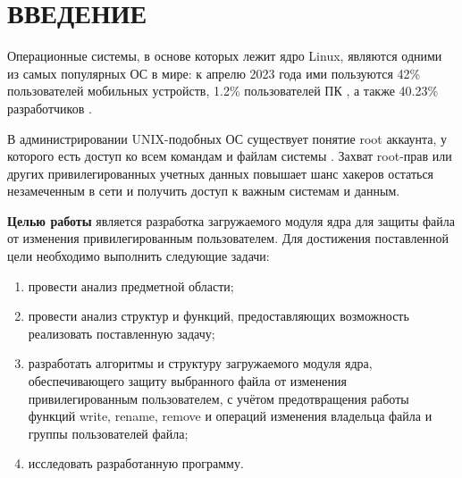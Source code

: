 \section*{\large ВВЕДЕНИЕ}

Операционные системы, в основе которых лежит ядро Linux, являются одними из самых популярных ОС в мире: к апрелю 2023 года ими пользуются 42\% пользователей мобильных устройств, 1.2\% пользователей ПК \cite{linux-statistics-2023}, а также 40.23\% разработчиков \cite{linux-dev-stats-stackoverflow}. 

В администрировании UNIX-подобных ОС существует понятие root аккаунта, у которого есть доступ ко всем командам и файлам системы \cite{root-definition}.
Захват root-прав или других привилегированных учетных данных повышает шанс хакеров остаться  незамеченным в сети и получить доступ к важным системам и данным.

\textbf{Целью работы} является разработка загружаемого модуля ядра для защиты файла от изменения привилегированным пользователем.
Для достижения поставленной цели необходимо выполнить следующие задачи:
\begin{enumerate}[label=\arabic*)]
	\item провести анализ предметной области;
	\item провести анализ структур и функций, предоставляющих возможность реализовать поставленную задачу;
	\item разработать алгоритмы и структуру загружаемого модуля ядра, обеспечивающего защиту выбранного файла от  изменения привилегированным пользователем, с учётом предотвращения работы функций write, rename, remove и операций изменения владельца файла и группы пользователей файла;
	\item исследовать разработанную программу.
\end{enumerate}

